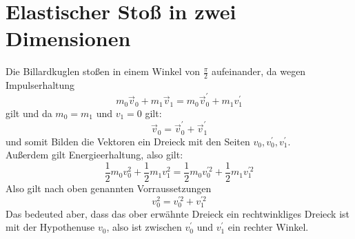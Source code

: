 \documentclass[sectionformat = aufgabe]{gadsescript}
\begin{document}
\maketitle
\section{Elastischer Stoß in zwei Dimensionen}
Die Billardkuglen stoßen in einem Winkel von $ \frac{ \pi }{ 2 }  $ aufeinander, da wegen Impulserhaltung
\[
	m_0 \vec v_0  + m_1 \vec v_1 = m_0 \vec v_0^{\prime} + m_1 v_1^{\prime} 
\]
gilt und da $ m_0 = m_1 $ und $ v_1 = 0 $ gilt:
\[
	\vec v_0 = \vec v_0^{\prime} + \vec v_1^{\prime} 
\]
und somit Bilden die Vektoren ein Dreieck mit den Seiten $ v_0, v_0^\prime, v_1^\prime $.\\
Außerdem gilt Energieerhaltung, also gilt:
\[
	\frac{ 1 }{ 2 } m_0 v_0^2 + \frac{ 1 }{ 2 } m_1 v_1^2 = \frac{ 1 }{ 2 } m_0 v_0^{\prime 2} + \frac{ 1 }{ 2 } m_1 v_1^{\prime 2} 
\]
Also gilt nach oben genannten Vorraussetzungen
\[
	v_0^2 = v_0^{\prime 2} + v_1^{\prime 2} 
\]
Das bedeuted aber, dass das ober erwähnte Dreieck ein rechtwinkliges Dreieck ist mit der Hypothenuse $ v_0 $, also ist zwischen $ v_0^{\prime} $ und $ v_1^\prime $ ein rechter Winkel.
\end{document}
